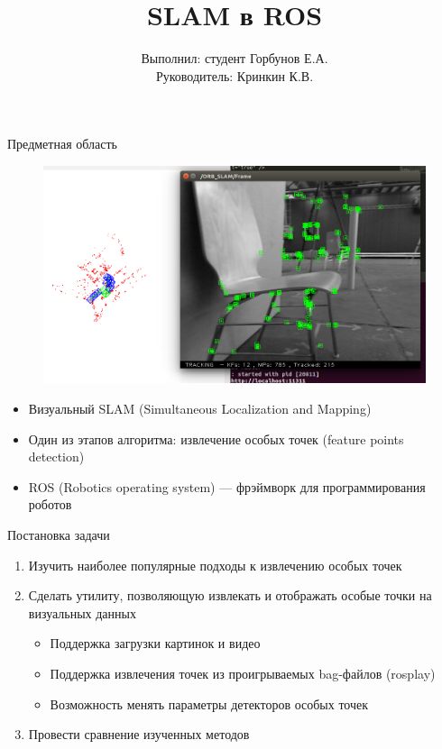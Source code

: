 


\usepackage[scale=2]{ccicons}



\title{SLAM в ROS}
\author{
Выполнил: \hfill студент Горбунов Е.А. \\
Руководитель: \hfill Кринкин К.В.
}


\maketitle

\begin{frame}[fragile]{Предметная область}

\begin{figure}
\centering
\includegraphics[scale=0.21]{data/slam_at_work_1}
\end{figure}
\begin{itemize}
\item Визуальный SLAM (Simultaneous Localization and Mapping)
\item Один из этапов алгоритма: извлечение особых точек (feature points detection)
\item ROS (Robotics operating system) --- фрэймворк для программирования роботов
\end{itemize}
\end{frame}

\begin{frame}{Постановка задачи}
\begin{enumerate}
\item Изучить наиболее популярные подходы к извлечению особых точек
\item Сделать утилиту, позволяющую извлекать и отображать особые точки на визуальных данных
	\begin{itemize}
		\item Поддержка загрузки картинок и видео
		\item Поддержка извлечения точек из проигрываемых bag-файлов (rosplay)
		\item Возможность менять параметры детекторов особых точек
	\end{itemize}
\item Провести сравнение изученных методов
\end{enumerate}
\end{frame}

